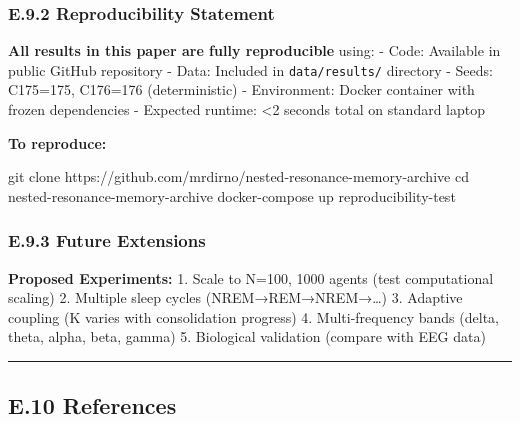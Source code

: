 \documentclass[
]{article}
\newenvironment{Shaded}{}{}
\newcommand{\BuiltInTok}[1]{\textcolor[rgb]{0.00,0.50,0.00}{#1}}
\newcommand{\ExtensionTok}[1]{#1}
\newcommand{\FunctionTok}[1]{\textcolor[rgb]{0.02,0.16,0.49}{#1}}
\newcommand{\NormalTok}[1]{#1}
\begin{document}
\subsubsection{E.9.2 Reproducibility
Statement}\label{e.9.2-reproducibility-statement}

\textbf{All results in this paper are fully reproducible} using: - Code:
Available in public GitHub repository - Data: Included in
\texttt{data/results/} directory - Seeds: C175=175, C176=176
(deterministic) - Environment: Docker container with frozen dependencies
- Expected runtime: \textless2 seconds total on standard laptop

\textbf{To reproduce:}

\begin{Shaded}
\begin{Highlighting}[]
\FunctionTok{git}\NormalTok{ clone https://github.com/mrdirno/nested{-}resonance{-}memory{-}archive}
\BuiltInTok{cd}\NormalTok{ nested{-}resonance{-}memory{-}archive}
\ExtensionTok{docker{-}compose}\NormalTok{ up reproducibility{-}test}
\end{Highlighting}
\end{Shaded}

\subsubsection{E.9.3 Future Extensions}\label{e.9.3-future-extensions}

\textbf{Proposed Experiments:} 1. Scale to N=100, 1000 agents (test
computational scaling) 2. Multiple sleep cycles (NREM→REM→NREM→\ldots)
3. Adaptive coupling (K varies with consolidation progress) 4.
Multi-frequency bands (delta, theta, alpha, beta, gamma) 5. Biological
validation (compare with EEG data)

\begin{center}\rule{0.5\linewidth}{0.5pt}\end{center}

\subsection{E.10 References}\label{e.10-references}
\end{document}
